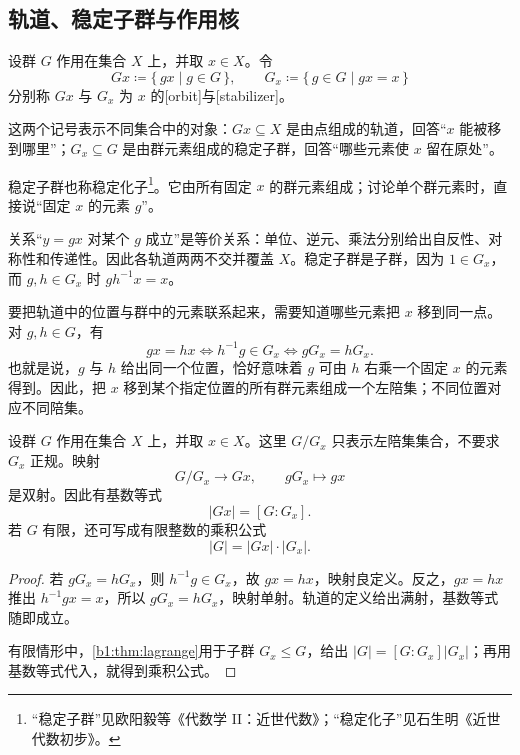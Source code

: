 \subsection{轨道、稳定子群与作用核}
\label{b1:subsec:0401:02}

\begin{definition}\label{b1:def:orbit-stabilizer}
	设群 \(G\) 作用在集合 \(X\) 上，并取 \(x\in X\)。令
	\[
		Gx\coloneqq\{\,gx\mid g\in G\,\},\qquad G_x\coloneqq\{\,g\in G\mid gx=x\,\}
	\]
	分别称 \(Gx\) 与 \(G_x\) 为 \(x\) 的[orbit]与[stabilizer]。
\end{definition}

这两个记号表示不同集合中的对象：\(Gx\subseteq X\) 是由点组成的轨道，回答“\(x\) 能被移到哪里”；\(G_x\subseteq G\) 是由群元素组成的稳定子群，回答“哪些元素使 \(x\) 留在原处”。

\ProseParagraphBreak
稳定子群也称稳定化子\footnote{“稳定子群”见欧阳毅等《代数学 II：近世代数》\cite[第 2.2.1 节]{OuyangYeChen2017AlgebraII}；“稳定化子”见石生明《近世代数初步》\cite[第一章第 6 节]{Shi2007IntroModernAlgebra}。}。它由所有固定 \(x\) 的群元素组成；讨论单个群元素时，直接说“固定 \(x\) 的元素 \(g\)”。

\ProseParagraphBreak
关系“\(y=gx\) 对某个 \(g\) 成立”是等价关系：单位、逆元、乘法分别给出自反性、对称性和传递性。因此各轨道两两不交并覆盖 \(X\)。稳定子群是子群，因为 \(1\in G_x\)，而 \(g,h\in G_x\) 时 \(gh^{-1}x=x\)。

\ProseParagraphBreak
要把轨道中的位置与群中的元素联系起来，需要知道哪些元素把 \(x\) 移到同一点。对 \(g,h\in G\)，有
\[
	gx=hx \iff h^{-1}g\in G_x \iff gG_x=hG_x.
\]
也就是说，\(g\) 与 \(h\) 给出同一个位置，恰好意味着 \(g\) 可由 \(h\) 右乘一个固定 \(x\) 的元素得到。因此，把 \(x\) 移到某个指定位置的所有群元素组成一个左陪集；不同位置对应不同陪集。

\begin{theorem}[轨道—稳定子群]\label{b1:thm:orbit-stabilizer}
	设群 \(G\) 作用在集合 \(X\) 上，并取 \(x\in X\)。这里 \(G/G_x\) 只表示左陪集集合，不要求 \(G_x\) 正规。映射
	\[
		G/G_x\longrightarrow Gx,\qquad gG_x\longmapsto gx
	\]
	是双射。因此有基数等式
	\[
		|Gx|=[G:G_x].
	\]
	若 \(G\) 有限，还可写成有限整数的乘积公式
	\[
		|G|=|Gx|\cdot|G_x|.
	\]
\end{theorem}
\begin{proof}
	若 \(gG_x=hG_x\)，则 \(h^{-1}g\in G_x\)，故 \(gx=hx\)，映射良定义。反之，\(gx=hx\) 推出 \(h^{-1}gx=x\)，所以 \(gG_x=hG_x\)，映射单射。轨道的定义给出满射，基数等式随即成立。

	有限情形中，\cref{b1:thm:lagrange}用于子群 \(G_x\leq G\)，给出 \(|G|=[G:G_x]|G_x|\)；再用基数等式代入，就得到乘积公式。
\end{proof}

